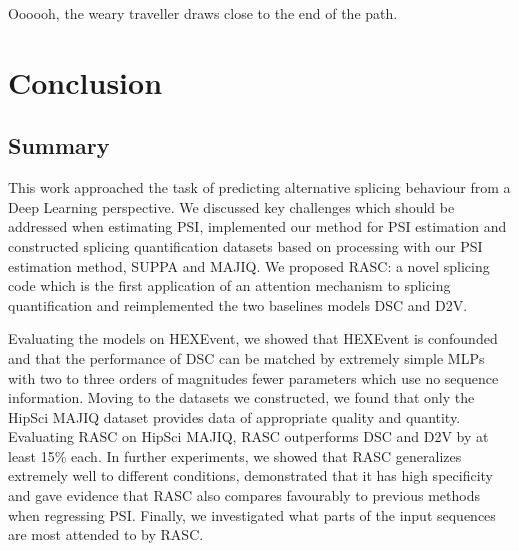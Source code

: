 \begin{savequote}[8cm]
	
	Oooooh, the weary traveller draws close to the end of the path.
\end{savequote}

\chapter{\label{ch:6-conclusion}Conclusion} %
\section{Summary}
This work approached the task of predicting alternative splicing behaviour from a Deep Learning perspective.
We discussed key challenges which should be addressed when estimating PSI, implemented our method for PSI estimation and constructed splicing quantification datasets based on processing with our PSI estimation method, SUPPA and MAJIQ. We proposed RASC: a novel splicing code which is the first application of an attention mechanism to splicing quantification and reimplemented the two baselines models DSC and D2V. %

Evaluating the models on HEXEvent, we showed that HEXEvent is confounded and that the performance of DSC can be matched by extremely simple MLPs with two to three orders of magnitudes fewer parameters which use no sequence information. 
Moving to the datasets we constructed, we found that only the HipSci MAJIQ dataset provides data of appropriate quality and quantity. Evaluating RASC on HipSci MAJIQ, RASC outperforms DSC and D2V by at least 15\% each. In further experiments, we showed that RASC generalizes extremely well to different conditions, demonstrated that it has high specificity and gave evidence that RASC also compares favourably to previous methods when regressing PSI. Finally, we investigated what parts of the input sequences are most attended to by RASC.
